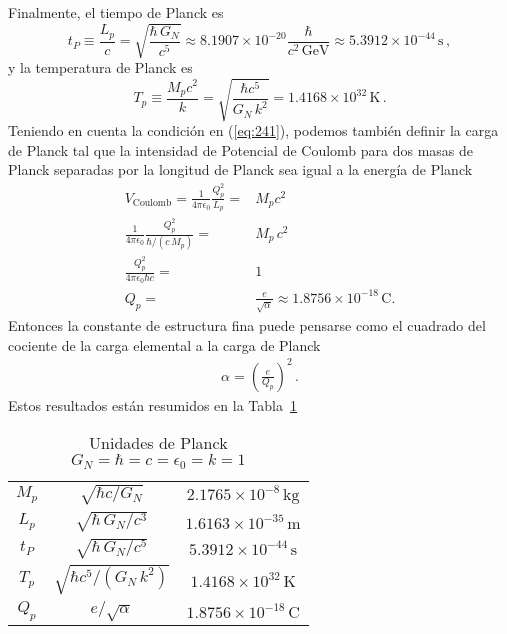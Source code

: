 Finalmente, el tiempo de Planck es
\begin{equation}
  t_P\equiv\frac{L_p}{c}=\sqrt{\frac{\hbar\, G_N}{c^5}}\approx8.1907\times10^{-20}\frac{\hbar}{c^2\,\text{GeV}}\approx5.3912\times10^{-44}\,\text{s}\,,
\end{equation}
y la temperatura de Planck es
\begin{equation}
  T_p\equiv\frac{M_p c^2}{k}=\sqrt{\frac{\hbar c^5}{G_N\,k^2}}=1.4168\times10^{32}\,\text{K}\,.
\end{equation}
Teniendo en cuenta la condición en (\ref{eq:241}), podemos también definir la carga de Planck tal que la intensidad de Potencial de Coulomb para dos masas de Planck separadas por la longitud de Planck sea igual a la energía de Planck
\begin{align}
  V_{\text{Coulomb}}=\frac{1}{4\pi\epsilon_0}\frac{Q_p^2}{L_p}=&M_pc^2\nonumber\\
  \frac{1}{4\pi\epsilon_0}\frac{Q_p^2}{\hbar/(c\,M_p)}=&M_p\,c^2\nonumber\\
  \frac{Q_p^2}{4\pi\epsilon_0\hbar c}=&1\nonumber\\
  Q_p=&\frac{e}{\sqrt{\alpha}}\approx1.8756\times10^{-18}\,\text{C}.
\end{align}
Entonces la constante de estructura fina puede pensarse como el cuadrado del cociente de la carga elemental a la carga de Planck
\begin{align}
  \alpha=\left(\frac{e}{Q_p}\right)^2\,.
\end{align}
Estos resultados están resumidos en la Tabla~\ref{tab:PU}
\begin{table} %
  \centering %
  \begin{tabular}{c|c|c} %
$M_p$&$\sqrt{\hbar c/G_N}$&$2.1765\times10^{-8}\,\text{kg}$\\
$L_p$&$\sqrt{{\hbar\, G_N}/{c^3}}$&$1.6163\times10^{-35}\,\text{m}$\\
$t_P$&$\sqrt{{\hbar\, G_N}/{c^5}}$&$5.3912\times10^{-44}\,\text{s}$\\
$T_p$&$\sqrt{{\hbar c^5}/(G_N\,k^2)}$&$1.4168\times10^{32}\,\text{K}$\\
$Q_p$&${e}/{\sqrt{\alpha}}$&$1.8756\times10^{-18}\,\text{C}$\\
  \end{tabular} %
  \caption{Unidades de Planck $G_N=\hbar=c=\epsilon_0=k=1$} %
  \label{tab:PU} %
\end{table} %

